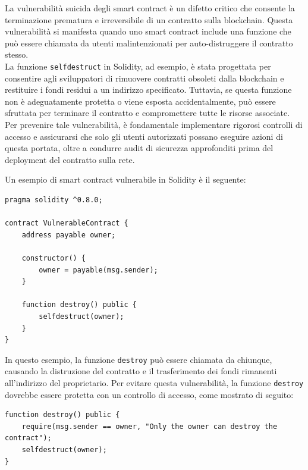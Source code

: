 \documentclass[../../Thesis.tex]{subfiles}
\begin{document}
La vulnerabilità suicida degli smart contract è un difetto critico che consente la terminazione prematura e irreversibile di un contratto sulla blockchain. Questa vulnerabilità si manifesta quando uno smart contract include una funzione che può essere chiamata da utenti malintenzionati per auto-distruggere il contratto stesso.\\
La funzione \texttt{selfdestruct} in Solidity, ad esempio, è stata progettata per consentire agli sviluppatori di rimuovere contratti obsoleti dalla blockchain e restituire i fondi residui a un indirizzo specificato. Tuttavia, se questa funzione non è adeguatamente protetta o viene esposta accidentalmente, può essere sfruttata per terminare il contratto e compromettere tutte le risorse associate. Per prevenire tale vulnerabilità, è fondamentale implementare rigorosi controlli di accesso e assicurarsi che solo gli utenti autorizzati possano eseguire azioni di questa portata, oltre a condurre audit di sicurezza approfonditi prima del deployment del contratto sulla rete.

Un esempio di smart contract vulnerabile in Solidity è il seguente:

\begin{lstlisting}[language=Solidity]
pragma solidity ^0.8.0;

contract VulnerableContract {
    address payable owner;

    constructor() {
        owner = payable(msg.sender);
    }

    function destroy() public {
        selfdestruct(owner);
    }
}
\end{lstlisting}

In questo esempio, la funzione \texttt{destroy} può essere chiamata da chiunque, causando la distruzione del contratto e il trasferimento dei fondi rimanenti all'indirizzo del proprietario. Per evitare questa vulnerabilità, la funzione \texttt{destroy} dovrebbe essere protetta con un controllo di accesso, come mostrato di seguito:

\begin{lstlisting}[language=Solidity]
function destroy() public {
    require(msg.sender == owner, "Only the owner can destroy the contract");
    selfdestruct(owner);
}
\end{lstlisting}
\end{document}
